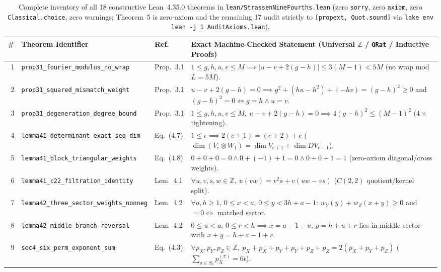 \documentclass[10pt,twocolumn]{article}
\newcommand{\ZZ}{\mathbb{Z}}
\begin{document}
\begin{table}[t]
\centering
\caption{Complete inventory of all 18 constructive Lean~4.35.0 theorems in \texttt{lean/StrassenNineFourths.lean} (zero \texttt{sorry}, zero \texttt{axiom}, zero \texttt{Classical.choice}, zero warnings; Theorem~5 is zero-axiom and the remaining 17 audit strictly to \texttt{[propext, Quot.sound]} via \texttt{lake env lean -j 1 AuditAxioms.lean}).}
\label{tab:lean18}
\scriptsize
\setlength{\tabcolsep}{3.0pt}
\begin{tabular}{@{}r l l p{10.5cm}@{}}
\toprule
\# & Theorem Identifier & Ref.~\cite{openai2026omega94upper} & Exact Machine-Checked Statement (Universal $\ZZ$ / \texttt{QRat} / Inductive Proofs) \\
\midrule
1 & \texttt{prop31\_fourier\_modulus\_no\_wrap} & Prop.~3.1 & $1\le g,h,u,v\le M \implies |u{-}v{+}2(g{-}h)|\le 3(M{-}1) < 5M$ (no wrap mod $L=5M$). \\
2 & \texttt{prop31\_squared\_mismatch\_weight} & Prop.~3.1 & $u{-}v{+}2(g{-}h)=0 \implies g^2{+}(hu{-}h^2){+}(-hv)=(g{-}h)^2\ge 0$ and $(g{-}h)^2=0\iff g=h\wedge u=v$. \\
3 & \texttt{prop31\_degeneration\_degree\_bound} & Prop.~3.1 & $1\le g,h,u,v\le M,\ u{-}v{+}2(g{-}h)=0 \implies 4(g{-}h)^2 \le (M{-}1)^2$ ($4\times$ tightening). \\
4 & \texttt{lemma41\_determinant\_exact\_seq\_dim} & Eq.~(4.7) & $1\le e \implies 2(e{+}1) = (e{+}2) + e$ ($\dim(V_e\otimes W_1)=\dim V_{e+1}+\dim D V_{e-1}$). \\
5 & \texttt{lemma41\_block\_triangular\_weights} & Eq.~(4.8) & $0{+}0{+}0=0 \wedge 0{+}(-1){+}1=0 \wedge 0{+}0{+}1=1$ (zero-axiom diagonal/cross weights). \\
6 & \texttt{lemma41\_c22\_filtration\_identity} & Lem.~4.1 & $\forall u,v,s,w\in\ZZ,\ u(vw) = v^2 s + v(uw - vs)$ ($C(2,2)$ quotient/kernel split). \\
7 & \texttt{lemma42\_three\_sector\_weights\_nonneg} & Lem.~4.2 & $\forall a,h\ge 1,\,0\le x<a,\,0\le y<3h{+}a{-}1$: $w_Y(y){+}w_Z(x{+}y)\ge 0$ and $=0\iff$ matched sector. \\
8 & \texttt{lemma42\_middle\_branch\_reversal} & Lem.~4.2 & $0\le u<a,\,0\le r<h \implies x=a{-}1{-}u,\,y=h{+}u{+}r$ lies in middle sector with $x{+}y=h{+}a{-}1{+}r$. \\
9 & \texttt{sec4\_six\_perm\_exponent\_sum} & Eq.~(4.3) & $\forall p_X,p_Y,p_Z\in\ZZ,\ p_X{+}p_X{+}p_Y{+}p_Y{+}p_Z{+}p_Z = 2(p_X{+}p_Y{+}p_Z)$ ($\sum_{\pi\in S_3}p_X^{(\pi)}=6t$). \\

\end{tabular}
\end{table}
\end{document}
